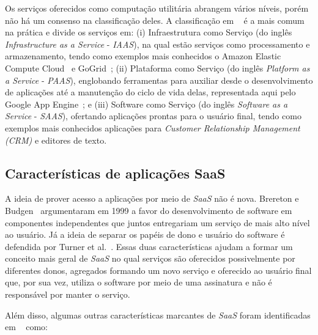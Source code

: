 \documentclass[a4paper,titlepage,12pt]{article}
\begin{document}
Os serviços oferecidos como computação utilitária abrangem vários níveis, porém não há um consenso na classificação deles. A classificação em ~\cite{cloud-services} é a mais comum na prática e divide os serviços em: (i) Infraestrutura como Serviço (do inglês \textit{Infrastructure as a Service} - \textit{IAAS}), na qual estão serviços como processamento e armazenamento, tendo como exemplos mais conhecidos o Amazon Elastic Compute Cloud~\cite{amazon-ec2} e GoGrid~\cite{gogrid}; (ii) Plataforma como Serviço (do inglês \textit{Platform as a Service} - \textit{PAAS}), englobando ferramentas para auxiliar desde o desenvolvimento de aplicações até a manutenção do ciclo de vida delas, representada aqui pelo Google App Engine~\cite{google-appengine}; e (iii) Software como Serviço (do inglês \textit{Software as a Service} - \textit{SAAS}), ofertando aplicações prontas para o usuário final, tendo como exemplos mais conhecidos aplicações para \textit{Customer Relationship Management (CRM)} e editores de texto.

\subsection{Características de aplicações SaaS}
A ideia de prover acesso a aplicações por meio de \textit{SaaS} não é nova. Brereton e Budgen~\cite{saas-firstreport} argumentaram em 1999 a favor do desenvolvimento de software em componentes independentes que juntos entregariam um serviço de mais alto nível ao usuário. Já a ideia de separar os papéis de dono e usuário do software é defendida por Turner et al.~\cite{saas-ownership-usage}. Essas duas características ajudam a formar um conceito mais geral de \textit{SaaS} no qual serviços são oferecidos possivelmente por diferentes donos, agregados formando um novo serviço e oferecido ao usuário final que, por sua vez, utiliza o software por meio de uma assinatura e não é responsável por manter o serviço. 

Além disso, algumas outras características marcantes de \textit{SaaS} foram identificadas em ~\cite{saas-characteristics} como:
\end{document}
